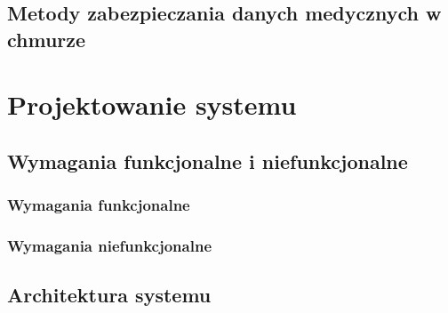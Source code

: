 \documentclass[12pt, a4paper, oneside]{report}
\begin{document}
\section{Metody zabezpieczania danych medycznych w chmurze}
\label{sec:bezpieczenstwo}



\chapter{Projektowanie systemu}
\label{chap:projektowanie}


\section{Wymagania funkcjonalne i niefunkcjonalne}
\label{sec:wymagania}

\subsection{Wymagania funkcjonalne}


\subsection{Wymagania niefunkcjonalne}



\section{Architektura systemu}
\label{sec:architektura}
\end{document}

